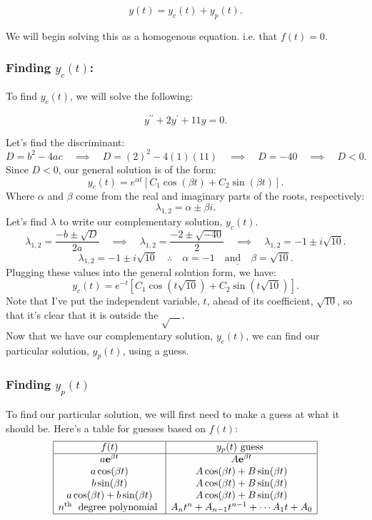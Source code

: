 \documentclass[a4paper,12pt]{article} %
\begin{document}
$$ y(t) = y_c(t) + y_p(t). $$

We will begin solving this as a homogenous equation. i.e. that $f(t)=0.$
\subsubsection*{Finding $y_c(t)$:}
To find $y_c(t)$, we will solve the following:

$$ y^{\prime \prime}+2 y^{\prime}+11 y = 0 .$$

Let's find the discriminant:
$$ D = b^2 - 4ac\quad\implies \quad D =  (2)^2 - 4(1)(11) \quad\implies \quad D = -40 \quad\implies\quad D<0.$$
Since $D<0$, our general solution is of the form:
$$ y_c(t) = e^{\alpha t}\left[C_1\cos(\beta t) + C_2\sin(\beta t)\right]. $$
Where $\alpha$ and $\beta$ come from the real and imaginary parts of the roots, respectively:
$$ \lambda_{1,2} = \alpha \pm \beta i. $$
Let's find $\lambda$ to write our complementary solution, $y_c(t)$.
$$ \lambda_{1,2} = \frac{-b \pm \sqrt{D}}{2a} \quad\implies \quad \lambda_{1,2} = \frac{-2 \pm \sqrt{-40}}{2} \quad\implies \quad \lambda_{1,2} = -1 \pm i\sqrt{10}. $$
$$ \lambda_{1,2} = -1 \pm i\sqrt{10} \quad\therefore\quad \underline{\alpha = -1 \quad\text{and}\quad \beta=\sqrt{10}.} $$
Plugging these values into the general solution form, we have:
$$\boxed{ y_c(t) = e^{-t}\left[C_1\cos{\left(t\sqrt{10}\right)} + C_2\sin{\left(t\sqrt{10}\right)}\right]. }$$
Note that I've put the independent variable, $t$, ahead of its coefficient, $\sqrt{10}$, so that it's clear that it is outside the $\sqrt{\quad}$.\\

Now that we have our complementary solution, $y_c(t)$, we can find our particular solution, $y_p(t)$, using a guess.
\subsubsection*{Finding $y_p(t)$}
To find our particular solution, we will first need to make a guess at what it should be. Here's a table for guesses based on $f(t)$:
$$ \begin{array}{|c|c|}
\hline f(t) & y_p(t) \text { guess } \\
\hline a \mathbf{e}^{\beta t} & A \mathbf{e}^{\beta t} \\
a \cos (\beta t) & A \cos (\beta t)+B \sin (\beta t) \\
b \sin (\beta t) & A \cos (\beta t)+B \sin (\beta t) \\
a \cos (\beta t)+b \sin (\beta t) & A \cos (\beta t)+B \sin (\beta t) \\
n^{\text {th }} \text { degree polynomial } & A_n t^n+A_{n-1} t^{n-1}+\cdots A_1 t+A_0 \\
\hline
\end{array} $$
\end{document}
